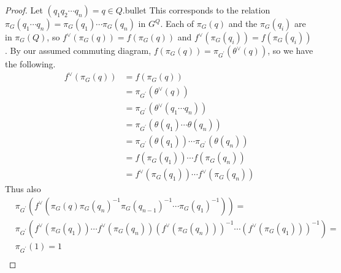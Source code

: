 \begin{proof}
	Let $(q_1q_2\cdots q_n) = q \in Q$.bullet
	This corresponds to the relation $\pi_G(q_1\cdots q_n) = \pi_G(q_1)\cdots \pi_G(q_n) $ in $G^Q$.
	Each of $\pi_G(q)$ and the  $\pi_G(q_i)$ are in  $\pi_G(Q)$, so  $f^\vee(\pi_G(q)) = f(\pi_G(q))$ and  $f^\vee(\pi_G(q_i)) = f(\pi_G(q_i))$.
	By our assumed commuting diagram,  $f(\pi_G(q)) = \pi_{G^\prime}(\theta^\vee(q))$, so we have the following.
	\begin{align*}
		f^\vee(\pi_G(q)) & = f(\pi_G(q))                                                    \\
		                 & = \pi_{G^\prime}(\theta^\vee(q))                                 \\
		                 & = \pi_{G^\prime}(\theta^\vee(q_1\cdots q_n))                     \\
		                 & = \pi_{G^\prime}(\theta(q_1) \cdots \theta(q_n))                 \\
		                 & = \pi_{G^\prime}(\theta(q_1)) \cdots \pi_{G^\prime}(\theta(q_n)) \\
		                 & = f(\pi_G(q_1)) \cdots f(\pi_G(q_n))                             \\
		                 & = f^\vee(\pi_G(q_1)) \cdots f^\vee(\pi_G(q_n))
	\end{align*}
	Thus also
	\begin{align*}
		 & \pi_{G^\prime}(f^\vee(\pi_G(q)\pi_G(q_n)^{-1}\pi_G(q_{n-1})^{-1} \cdots \pi_G(q_1)^{-1})) =                            \\
		 & \pi_{G^\prime}(f^\vee(\pi_G(q_1))\cdots f^\vee(\pi_G(q_n))(f^\vee(\pi_G(q_n)))^{-1}\cdots (f^\vee(\pi_G(q_1)))^{-1}) = \\
		 & \pi_{G^\prime}(1)  = 1                                                                                                 \\
	\end{align*}
\end{proof}

